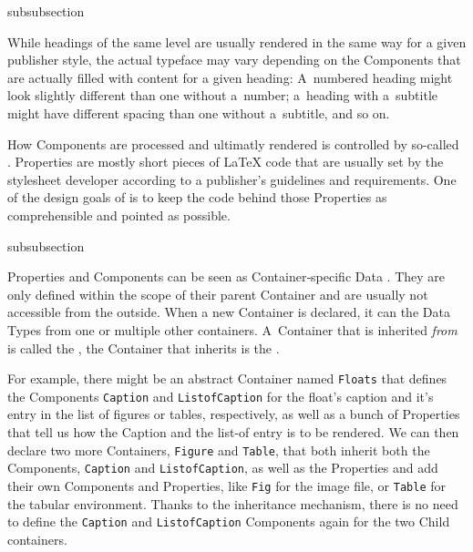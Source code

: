 \begin{Heading}[label=sec:overview.properties]{subsubsection}
\end{Heading}

While headings of the same level are usually rendered in the same way
for a given publisher style, the actual typeface may vary depending on
the Components that are actually filled with content for a given
heading: A~numbered heading might look slightly different than one
without a~number; a~heading with a~subtitle might have different
spacing than one without a~subtitle, and so on.

How Components are processed and ultimatly rendered is controlled by
so-called . Properties are
mostly short pieces of {\LaTeX} code that are usually set by the
stylesheet developer according to a publisher's guidelines and
requirements. One of the design goals of {\CoCoTeX} is to keep the
code behind those Properties as comprehensible and pointed as
possible.

\begin{Heading}[label=sec:overview.types]{subsubsection}
\end{Heading}

Properties and Components can be seen as Container‐specific Data
. They are only defined within the scope of
their parent Container and are usually not accessible from the
outside. When a new Container is declared, it can
 the Data Types from one or multiple
other containers. A~Container that is inherited \textit{from} is
called the , the Container that inherits is
the .

For example, there might be an abstract Container named
\texttt{Floats} that defines the Components \texttt{Caption} and
\texttt{ListofCaption} for the float's caption and it's entry in the
list of figures or tables, respectively, as well as a bunch of
Properties that tell us how the Caption and the list-of entry is to be
rendered. We can then declare two more Containers, \texttt{Figure} and
\texttt{Table}, that both inherit both the Components,
\texttt{Caption} and \texttt{ListofCaption}, as well as the Properties
and add their own Components and Properties, like \texttt{Fig} for the
image file, or \texttt{Table} for the tabular environment. Thanks to
the inheritance mechanism, there is no need to define the
\texttt{Caption} and \texttt{ListofCaption} Components again for the
two Child containers.

